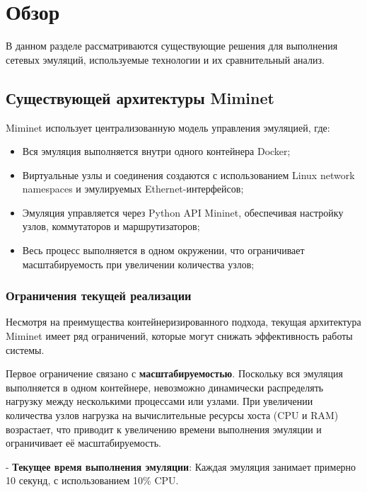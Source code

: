 
\section{Обзор}
\label{sec:relatedworks}

В данном разделе рассматриваются существующие решения для выполнения сетевых эмуляций, используемые технологии и их сравнительный анализ.

\subsection{Существующей архитектуры Miminet}

Miminet использует централизованную модель управления эмуляцией, где:
\begin{itemize}
    \item Вся эмуляция выполняется внутри одного контейнера Docker;
    \item Виртуальные узлы и соединения создаются с использованием Linux network namespaces и эмулируемых Ethernet-интерфейсов;
    \item Эмуляция управляется через Python\cite{python} API Mininet, обеспечивая настройку узлов, коммутаторов и маршрутизаторов;
    \item Весь процесс выполняется в одном окружении, что ограничивает масштабируемость при увеличении количества узлов;
\end{itemize}

\subsubsection{Ограничения текущей реализации}

Несмотря на преимущества контейнеризированного подхода, текущая архитектура Miminet имеет ряд ограничений, которые могут снижать эффективность работы системы.

Первое ограничение связано с \textbf{масштабируемостью}. Поскольку вся эмуляция выполняется в одном контейнере, невозможно динамически распределять нагрузку между несколькими процессами или узлами. При увеличении количества узлов нагрузка на вычислительные ресурсы хоста (CPU и RAM) возрастает, что приводит к увеличению времени выполнения эмуляции и ограничивает её масштабируемость.

- \textbf{Текущее время выполнения эмуляции}: Каждая эмуляция занимает примерно 10 секунд, с использованием 10\% CPU.


